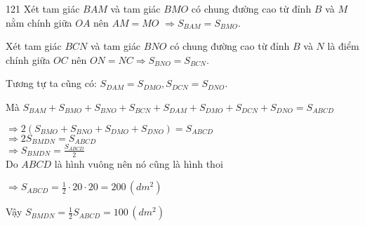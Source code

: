 \begin{Answer}{121}
		Xét tam giác $BAM$ và tam giác $BMO$ có chung đường cao từ đỉnh $B$ và $M$ nằm chính giữa $OA$ nên  $AM=MO$  $\Rightarrow {{S}_{BAM}}={{S}_{BMO}}$.
		
		Xét tam giác $BCN$ và tam giác $BNO$ có chung đường cao từ đỉnh $B$ và $N$ là điểm chính giữa $OC$ nên  $ON=NC\Rightarrow {{S}_{BNO}}={{S}_{BCN}}$.
		
		Tương tự ta cũng có:  ${{S}_{DAM}}={{S}_{DMO}},{{S}_{DCN}}={{S}_{DNO}}$.
		
		Mà  ${{S}_{BAM}}+{{S}_{BMO}}+{{S}_{BNO}}+{{S}_{BCN}}+{{S}_{DAM}}+{{S}_{DMO}}+{{S}_{DCN}}+{{S}_{DNO}}={{S}_{ABCD}}$
		
		$\Rightarrow 2({{S}_{BMO}}+{{S}_{BNO}}+{{S}_{DMO}}+{{S}_{DNO}})={{S}_{ABCD}}$\\
		$\Rightarrow 2{{S}_{BMDN}}={{S}_{ABCD}}$ \\
		$\Rightarrow {{S}_{BMDN}}=\frac{{{S}_{ABCD}}}{2}$\\
		
		Do $ABCD$ là hình vuông nên nó cũng là hình thoi
		
		$\Rightarrow {{S}_{ABCD}}=\frac{1}{2}\cdot20\cdot20=200\,(dm^2)$
		
		Vậy  ${{S}_{BMDN}}=\frac{1}{2}{{S}_{ABCD}}=100\,(dm^2)$
	
\end{Answer}
